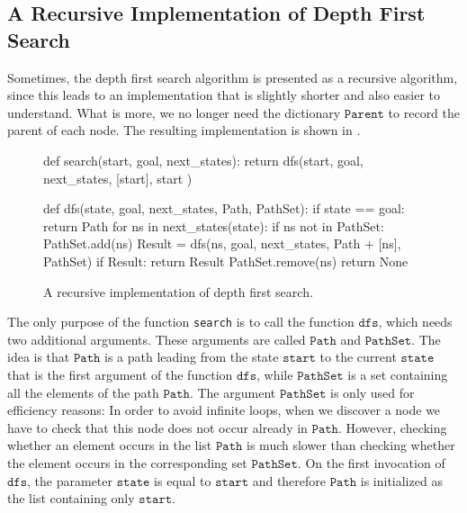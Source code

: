 \subsection{A Recursive Implementation of Depth First Search}
Sometimes, the depth first search algorithm is presented as a recursive algorithm, since this leads
to an implementation that is slightly shorter and also easier to understand.  What is more, we no
longer need the dictionary $\texttt{Parent}$ to record the parent of each node.  The resulting
implementation is shown in .

\begin{figure}[!ht]
\centering
\begin{python3code}
    def search(start, goal, next_states):
        return dfs(start, goal, next_states, [start], { start })
    
    def dfs(state, goal, next_states, Path, PathSet):
        if state == goal:
            return Path
        for ns in next_states(state):
            if ns not in PathSet:
                PathSet.add(ns)
                Result = dfs(ns, goal, next_states, Path + [ns], PathSet)
                if Result:
                    return Result
                PathSet.remove(ns)
        return None
\end{python3code}
\vspace*{-0.3cm}
\caption{A recursive implementation of depth first search.}
\label{fig:Depth-First-Search.ipynb}
\end{figure}
The only purpose of the function \texttt{search} is to call the function $\texttt{dfs}$, which needs two
additional arguments.  These arguments are called $\texttt{Path}$ and $\texttt{PathSet}$.  The idea is that $\texttt{Path}$ is
a path leading from the state $\texttt{start}$ to the current $\texttt{state}$ that is the first
argument of the function $\texttt{dfs}$, while $\texttt{PathSet}$ is a set containing all the elements of the
path $\texttt{Path}$.  The argument $\texttt{PathSet}$ is only used for efficiency reasons:  In order to avoid
infinite loops, when we discover a node we have to check that this node does not occur already in $\texttt{Path}$.
However, checking whether an element occurs in the list $\texttt{Path}$ is much slower than checking whether
the element occurs in the corresponding set $\texttt{PathSet}$.  On the first invocation of $\texttt{dfs}$, the
parameter $\texttt{state}$ is equal to $\texttt{start}$ and therefore $\texttt{Path}$ is initialized
as the list containing only $\texttt{start}$.

